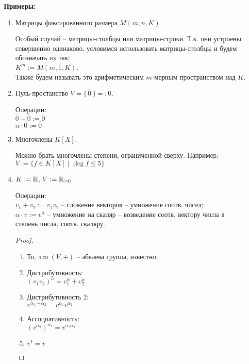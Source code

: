 \textbf{Примеры:}
\begin{enumerate}
    \item Матрицы фиксированного размера $M(m, n, K)$.
    
    Особый случай -- матрицы-столбцы или матрицы-строки. Т.к.
    они устроены совершенно одинаково, условимся использовать
    матрицы-столбцы и будем обозначать их так: \\
    $K^m := M(m, 1, K)$.\\
    Также будем называть это арифметическим $m$-мерным пространством
    над $K$.

    \item Нуль-простанство $V = \{\, \overline{0} \,\} =: 0$.
    
    Операции:\\
    $\overline{0} + \overline{0} := \overline{0}$\\
    $\alpha \cdot \overline{0} := \overline{0}$

    \item Многочлены $K[X]$.
    
    Можно брать многочлены степени, ограниченной сверху. Например:\\
    $V := \{ f \in K[X] \mid \deg f \leqslant 5 \}$

    \item $K := \mathbb{R}$, $V := \mathbb{R}_{> 0}$
    
    Операции:\\
    $v_1 + v_2 := v_1 v_2$ -- сложение векторов -- умножение соотв.
    чисел;\\
    $\alpha \cdot v := v ^ \alpha$ -- умножение на скаляр -- возведение
    соотв. вектору числа в степень числа, соотв. скаляру.

    \begin{proof} $ $

        \begin{enumerate}
            \item То, что $(V, +)$ -- абелева группа, известно;
            \item Дистрибутивность: \\
            $(v_1 v_2)^\alpha = v_1^\alpha + v_2^\alpha$
            \item Дистрибутивность 2: \\
            $v^{\alpha_1 + \alpha_2} = v^{\alpha_1} v^{\alpha_2}$
            \item Ассоциативность: \\
            $(v^{\alpha_2})^{\alpha_1} = v^{\alpha_1 \alpha_2}$
            \item $v ^ 1 = v$
        \end{enumerate}
    \end{proof}


\end{enumerate}
